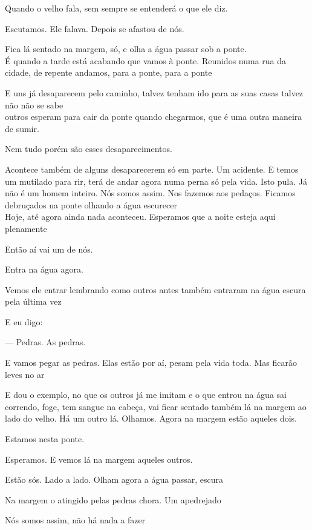 Quando o velho fala, sem sempre se entenderá o que ele diz.

Escutamos. Ele falava. Depois se afastou de nós.

Fica lá sentado na margem, só, e olha a água passar sob a ponte.\\

É quando a tarde está acabando que vamos à ponte. Reunidos numa rua da
cidade, de repente andamos, para a ponte, para a ponte

E uns já desaparecem pelo caminho, talvez tenham ido para as suas casas
talvez não não se sabe\\

outros esperam para cair da ponte quando chegarmos, que é uma outra
maneira de sumir.

Nem tudo porém são esses desaparecimentos.

Acontece também de alguns desaparecerem só em parte. Um acidente. E
temos um mutilado para rir, terá de andar agora numa perna só pela vida.
Isto pula. Já não é um homem inteiro. Nós somos assim. Nos fazemos aos
pedaços. Ficamos debruçados na ponte olhando a água escurecer\\

Hoje, até agora ainda nada aconteceu. Esperamos que a noite esteja aqui
plenamente

Então aí vai um de nós.

Entra na água agora.

Vemos ele entrar lembrando como outros antes também entraram na água
escura pela última vez

E eu digo:

--- Pedras. As pedras.

E vamos pegar as pedras. Elas estão por aí, pesam pela vida toda. Mas
ficarão leves no ar

E dou o exemplo, no que os outros já me imitam e o que entrou na água
sai correndo, foge, tem sangue na cabeça, vai ficar sentado também lá na
margem ao lado do velho. Há um outro lá. Olhamos. Agora na margem estão
aqueles dois.

Estamos nesta ponte.

Esperamos. E vemos lá na margem aqueles outros.

Estão sós. Lado a lado. Olham agora a água passar, escura

Na margem o atingido pelas pedras chora. Um apedrejado

Nós somos assim, não há nada a fazer\\


